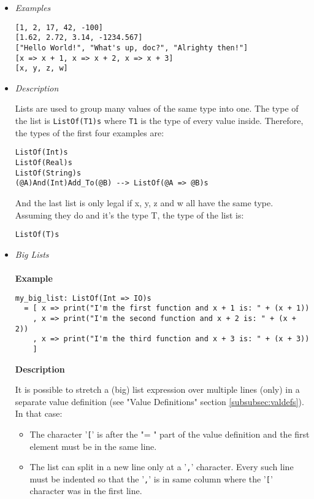 \documentclass[diploma]{softlab-thesis}
\begin{document}
\begin{itemize}

\item \textit{Examples}
\begin{verbatim}
[1, 2, 17, 42, -100]
[1.62, 2.72, 3.14, -1234.567]
["Hello World!", "What's up, doc?", "Alrighty then!"]
[x => x + 1, x => x + 2, x => x + 3]
[x, y, z, w]
\end{verbatim}

\item \textit{Description}

Lists are used to group many values of the same type into one.  The type of the
list is \verb|ListOf(T1)s| where \verb|T1| is the type of every value inside.
Therefore, the types of the first four examples are:
\begin{verbatim}
ListOf(Int)s
ListOf(Real)s
ListOf(String)s
(@A)And(Int)Add_To(@B) --> ListOf(@A => @B)s
\end{verbatim}
And the last list is only legal if x, y, z and w all have the same type.
Assuming they do and it's the type T, the type of the list is:
\begin{verbatim}
ListOf(T)s
\end{verbatim}

\newpage
\item \textit{Big Lists}
  \\\\
  \textbf{Example}

  \begin{verbatim}
my_big_list: ListOf(Int => IO)s
  = [ x => print("I'm the first function and x + 1 is: " + (x + 1))
    , x => print("I'm the second function and x + 2 is: " + (x + 2))
    , x => print("I'm the third function and x + 3 is: " + (x + 3))
    ]
  \end{verbatim}

  \textbf{Description}

  It is possible to stretch a (big) list expression over multiple lines (only)
  in a separate value definition (see "Value Definitions" section
  \ref{subsubsec:valdefs}).  In that case:
  \begin{itemize}
  \item
  The character '\verb|[|' is after the "= " part of the value definition
  and the first element must be in the same line.

  \item
  The list can split in a new line only at a '\verb|,|' character. Every such
  line must be indented so that the '\verb|,|' is in same column where the
  '\verb|[|' character was in the first line.


\end{itemize}
\end{itemize}
\end{document}
